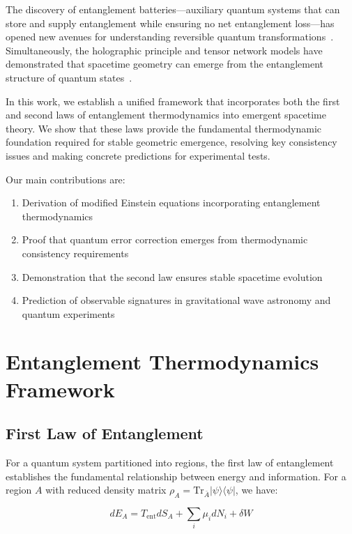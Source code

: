 \documentclass[twocolumn,showpacs,preprintnumbers,amsmath,amssymb,aps]{revtex4-1}
\begin{document}
The discovery of entanglement batteries—auxiliary quantum systems that can store and supply entanglement while ensuring no net entanglement loss—has opened new avenues for understanding reversible quantum transformations~\cite{ganardi2025second}. Simultaneously, the holographic principle and tensor network models have demonstrated that spacetime geometry can emerge from the entanglement structure of quantum states~\cite{ryu2006,pastawski2015}.

In this work, we establish a unified framework that incorporates both the first and second laws of entanglement thermodynamics into emergent spacetime theory. We show that these laws provide the fundamental thermodynamic foundation required for stable geometric emergence, resolving key consistency issues and making concrete predictions for experimental tests.

Our main contributions are:
\begin{enumerate}
\item Derivation of modified Einstein equations incorporating entanglement thermodynamics
\item Proof that quantum error correction emerges from thermodynamic consistency requirements
\item Demonstration that the second law ensures stable spacetime evolution
\item Prediction of observable signatures in gravitational wave astronomy and quantum experiments
\end{enumerate}

\section{Entanglement Thermodynamics Framework}

\subsection{First Law of Entanglement}

For a quantum system partitioned into regions, the first law of entanglement establishes the fundamental relationship between energy and information. For a region $A$ with reduced density matrix $\rho_A = \text{Tr}_{\bar{A}}|\psi\rangle\langle\psi|$, we have:

\begin{equation}
dE_A = T_{\text{ent}} dS_A + \sum_i \mu_i dN_i + \delta W
\label{eq:first_law}
\end{equation}
\end{document}
